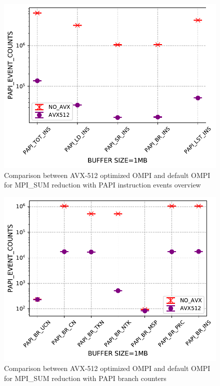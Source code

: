 \documentclass[sigconf]{acmart}
\begin{document}
\begin{figure}[h]
    \centering
    \includegraphics[width=\linewidth]{papi_ins.pdf}
    \caption{Comparison between AVX-512 optimized OMPI and default OMPI for MPI\_SUM reduction with PAPI instruction events overview}
    \label{fig:papi_ins}
\end{figure}

\begin{figure}[h]
    \centering
    \includegraphics[width=\linewidth]{papi_br.pdf}
    \caption{Comparison between AVX-512 optimized OMPI and default OMPI for MPI\_SUM reduction with PAPI branch counters}
    \label{fig:papi_br}
\end{figure}
\end{document}
